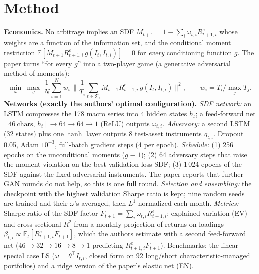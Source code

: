 \documentclass[10pt]{article}
\begin{document}
\section{Method}
\textbf{Economics.} No arbitrage implies an SDF $M_{t+1}=1-\sum_i \omega_{t,i}R^e_{t+1,i}$ whose weights are a
function of the information set, and the conditional moment restriction
$\mathbb E\!\left[M_{t+1}R^e_{t+1,i}\,g(I_t,I_{t,i})\right]=0$ for \emph{every} conditioning function $g$. The paper
turns ``for every $g$'' into a two-player game (a generative adversarial method of moments):
\[
\min_{\omega}\ \max_{g}\ \frac1N\sum_{i=1}^{N} w_i\,\Big\|\frac{1}{T_i}\sum_{t\in\mathcal T_i} M_{t+1}R^e_{t+1,i}\,g(I_t,I_{t,i})\Big\|^2 ,
\qquad w_i = T_i/\max_j T_j .
\]
\textbf{Networks (exactly the authors' optimal configuration).}
\emph{SDF network:} an LSTM compresses the 178 macro series into 4 hidden states $h_t$; a feed-forward net
$[46\ \text{chars},\,h_t]\to64\to64\to1$ (ReLU) outputs $\omega_{t,i}$.
\emph{Adversary:} a second LSTM (32 states) plus one $\tanh$ layer outputs 8 test-asset instruments $g_{t,i}$.
Dropout 0.05, Adam $10^{-3}$, full-batch gradient steps (4 per epoch).
\emph{Schedule:} (1) 256 epochs on the unconditional moments ($g\equiv1$); (2) 64 adversary steps that raise the
moment violation on the best-validation-loss SDF; (3) 1\,024 epochs of the SDF against the fixed adversarial
instruments. The paper reports that further GAN rounds do not help, so this is one full round.
\emph{Selection and ensembling:} the checkpoint with the highest validation Sharpe ratio is kept; nine random seeds
are trained and their $\omega$'s averaged, then $L^1$-normalized each month.
\emph{Metrics:} Sharpe ratio of the SDF factor $F_{t+1}=\sum_i\omega_{t,i}R^e_{t+1,i}$; explained variation (EV)
and cross-sectional $R^2$ from a monthly projection of returns on loadings $\beta_{t,i}\propto\mathbb E_t[R^e_{t+1,i}F_{t+1}]$,
which the authors estimate with a second feed-forward net ($46\to32\to16\to8\to1$ predicting $R^e_{t+1,i}F_{t+1}$).
Benchmarks: the linear special case LS ($\omega=\theta^\top I_{t,i}$, closed form on 92 long/short characteristic-managed
portfolios) and a ridge version of the paper's elastic net (EN).
\end{document}
